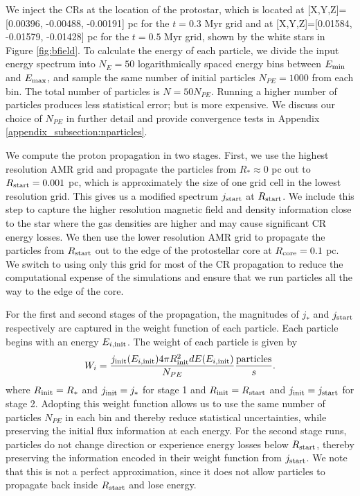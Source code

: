 \documentclass[twocolumn]{aastex63}
\def\t{\text}
\begin{document}
We inject the CRs at the location of the protostar, which is located at  [X,Y,Z]=[0.00396, -0.00488, -0.00191] pc for the $t=0.3$ Myr grid and at [X,Y,Z]=[0.01584, -0.01579, -0.01428] pc for the $t=0.5$ Myr grid, shown by the white stars in Figure \ref{fig:bfield}. To calculate the energy of each particle, we divide the input energy spectrum into $N_E=50$ logarithmically spaced energy bins between $E_{\rm min}$ and $E_{\rm max}$, and sample the same number of initial particles $N_{PE}=1000$ from each bin. The total number of particles is $N=50 N_{PE}$. Running a higher number of particles produces less statistical error; but is more expensive. We discuss our choice of $N_{PE}$ in further detail and provide convergence tests in Appendix \ref{appendix_subsection:nparticles}. 

We compute the proton propagation in two stages. First, we use the highest resolution AMR grid and propagate the particles from $R_* \approx 0$ pc out to $R_{\rm start}=0.001$ pc, which is approximately the size of one grid cell in the lowest resolution grid. This gives us a modified spectrum $j_{\rm start}$ at $R_{\rm start}$. We include this step to capture the higher resolution magnetic field and density information close to the star where the gas densities are higher and may cause significant CR energy losses. We then use the lower resolution AMR grid to propagate the particles from $R_{\rm start}$ out to the edge of the protostellar core at $R_{\rm core}=0.1$ pc. We switch to using only this grid for most of the CR propagation to reduce the computational expense of the simulations and ensure that we run particles all the way to the edge of the core.  

For the first and second stages of the propagation, the magnitudes of $j_*$ and $j_{\rm start}$ respectively are captured in the weight function of each particle. Each particle begins with an energy $E_{i,\rm init}$. The weight of each particle is given by 
\begin{equation}
    \label{eq:weight}
    W_i=\frac{j_{\rm init}(E_{i,\rm init})4\pi R_{\rm init}^2 dE(E_{i, \rm init})}{N_{PE}}  \frac{\t{particles}}{s}.  
\end{equation}
where $R_{\rm init}=R_{*}$ and $j_{\rm init}=j_*$ for stage 1 and $R_{\rm init}=R_{\rm start}$ and $j_{\rm init}=j_{\rm start}$ for stage 2. Adopting this weight function allows us to use the same number of particles $N_{PE}$ in each bin and thereby reduce statistical uncertainties, while preserving the initial flux information at each energy. For the second stage runs, particles do not change direction or experience energy losses below $R_{\rm start}$, thereby preserving the information encoded in their weight function from $j_{\rm start}$. We note that this is not a perfect approximation, since it does not allow particles to propagate back inside $R_{\rm start}$ and lose energy.
\end{document}
